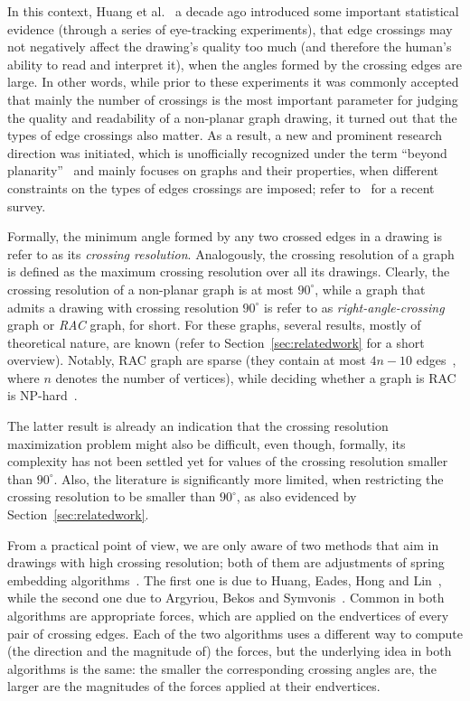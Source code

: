 \documentclass{llncs}
\begin{document}
In this context, Huang et al.~\cite{DBLP:conf/apvis/Huang07,DBLP:journals/vlc/HuangEH14} a decade ago introduced some important statistical evidence (through a series of eye-tracking experiments), that edge crossings may not negatively affect the drawing's quality too much (and therefore the human's ability to read and interpret it), when the angles formed by the crossing edges are large. In other words, while prior to these experiments it was commonly accepted that mainly the number of crossings is the most important parameter for judging the quality and readability of a non-planar graph drawing, it turned out that the types of edge crossings also matter. As a result, a new and prominent research direction was initiated, which is unofficially recognized under the term ``beyond planarity''~\cite{Shonan2016,Dagstuhl2016,SoCG2017} and mainly focuses on graphs and their properties, when different constraints on the types of edges crossings are imposed; refer to~\cite{DBLP:journals/corr/abs-1804-07257} for a recent survey. 

Formally, the minimum angle formed by any two crossed edges in a drawing is refer to as its \emph{crossing resolution}. Analogously, the crossing resolution of a graph is defined as the maximum crossing resolution over all its drawings. Clearly, the crossing resolution of a non-planar graph is at most $90^\circ$, while a graph that admits a drawing with crossing resolution $90^\circ$ is refer to as \emph{right-angle-crossing} graph or \emph{RAC} graph, for short. For these graphs, several results, mostly of theoretical nature, are known (refer to Section~\ref{sec:relatedwork} for a short overview). Notably, RAC graph are sparse (they contain at most $4n-10$ edges~\cite{DBLP:journals/tcs/DidimoEL11}, where $n$ denotes the number of  vertices), while deciding whether a graph is RAC is NP-hard~\cite{DBLP:journals/jgaa/ArgyriouBS12}. 

The latter result is already an indication that the crossing resolution maximization problem might also be difficult, even though, formally, its complexity has not been settled yet for values of the crossing resolution smaller than $90^\circ$. Also, the literature is significantly more limited, when restricting the crossing resolution to be smaller than $90^\circ$, as also evidenced by Section~\ref{sec:relatedwork}. 

From a practical point of view, we are only aware of two methods that aim in drawings with high crossing resolution; both of them are adjustments of spring embedding algorithms~\cite{DBLP:journals/congnum/Eades84}. The first one is due to Huang, Eades, Hong and Lin~\cite{DBLP:journals/vlc/HuangEHL13}, while the second one due to Argyriou, Bekos and Symvonis~\cite{DBLP:journals/cj/ArgyriouBS13}. Common in both algorithms are appropriate forces, which are applied on the endvertices of every pair of crossing edges. Each of the two algorithms uses a different way to compute (the direction and the magnitude of) the forces, but the underlying idea in both algorithms is the same: the smaller the corresponding crossing angles are, the larger are the magnitudes of the forces applied at their endvertices. 
\end{document}
